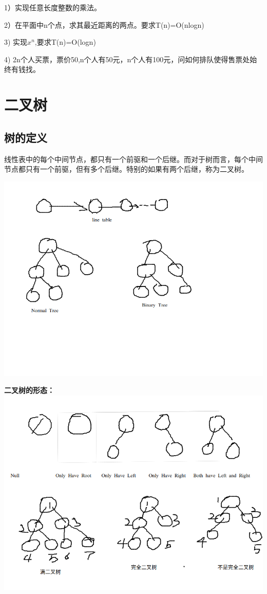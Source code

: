 \documentclass{article}
\begin{document}
		1）实现任意长度整数的乘法。

		2）在平面中n个点，求其最近距离的两点。要求T(n)=O(nlogn)

		3) 实现$x^n$,要求T(n)=O(logn)

		4) 2n个人买票，票价50,n个人有50元，n个人有100元，问如何排队使得售票处始终有钱找。



\section{二叉树}
	\subsection{树的定义}
		线性表中的每个中间节点，都只有一个前驱和一个后继。而对于树而言，每个中间节点都只有一个前驱，但有多个后继。特别的如果有两个后继，称为二叉树。

	\includegraphics[scale=0.4]{./pic/tree-01.png}

	\textbf{二叉树的形态：}
	\includegraphics[scale=0.4]{./pic/tree-02.png}
	
\end{document}

